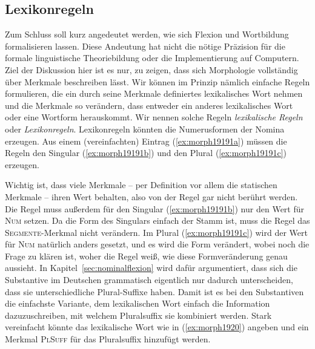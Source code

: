 \subsection{Lexikonregeln}

\label{sec:lexikonregel}

Zum Schluss soll kurz angedeutet werden, wie sich Flexion und Wortbildung formalisieren lassen.
Diese Andeutung hat nicht die nötige Präzision für die formale linguistische Theoriebildung oder die Implementierung auf Computern.
Ziel der Diskussion hier ist es nur, zu zeigen, dass sich Morphologie vollständig über Merkmale beschreiben lässt.
Wir können im Prinzip nämlich einfache Regeln formulieren, die ein durch seine Merkmale definiertes lexikalisches Wort nehmen und die Merkmale so verändern, dass entweder ein anderes lexikalisches Wort oder eine Wortform herauskommt.
Wir nennen solche Regeln \textit{lexikalische Regeln} oder \textit{Lexikonregeln}.
Lexikonregeln könnten \zB die Numerusformen der Nomina erzeugen.
Aus einem (vereinfachten) Eintrag (\ref{ex:morph19191a}) müssen die Regeln den Singular (\ref{ex:morph19191b}) und den Plural (\ref{ex:morph19191c}) erzeugen.

\begin{exe}
  \ex\label{ex:morph19191}
  \begin{xlist}
  \end{xlist}
\end{exe}

Wichtig ist, dass viele Merkmale -- per Definition vor allem die statischen Merkmale -- ihren Wert behalten, also von der Regel gar nicht berührt werden.
Die Regel muss außerdem für den Singular (\ref{ex:morph19191b}) nur den Wert für \textsc{Num} setzen.
Da die Form des Singulars einfach der Stamm ist, muss die Regel das \textsc{Segmente}-Merkmal nicht verändern.
Im Plural (\ref{ex:morph19191c}) wird der Wert für \textsc{Num} natürlich anders gesetzt, und es wird die Form verändert, wobei noch die Frage zu klären ist, woher die Regel weiß, wie diese Formveränderung genau aussieht.
In Kapitel~\ref{sec:nominalflexion} wird dafür argumentiert, dass sich die Substantive im Deutschen grammatisch eigentlich nur dadurch unterscheiden, dass sie unterschiedliche Plural-Suffixe haben.
Damit ist es bei den Substantiven die einfachste Variante, dem lexikalischen Wort einfach die Information dazuzuschreiben, mit welchem Pluralsuffix sie kombiniert werden.
Stark vereinfacht könnte das lexikalische Wort wie in (\ref{ex:morph1920}) angeben und ein Merkmal \textsc{PlSuff} für das Pluralsuffix hinzufügt werden.

